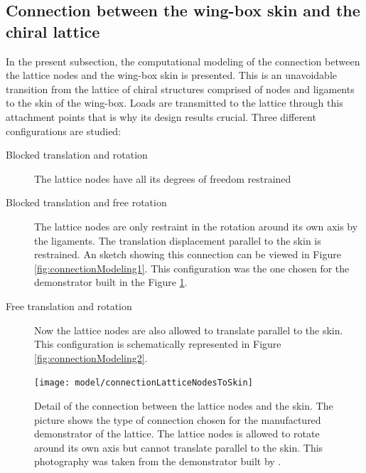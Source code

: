   \clearpage
  \subsection{Connection between the wing-box skin and the chiral lattice} \label{subsec:connections_computationalModel}

    In the present subsection, the computational modeling of the connection between the lattice nodes and the wing-box skin is presented. This is an unavoidable transition from the lattice of chiral structures comprised of nodes and ligaments to the skin of the wing-box. Loads are transmitted to the lattice through this attachment points that is why its design results crucial. Three different configurations are studied:

    \begin{description}
      \item[Blocked translation and rotation] The lattice nodes have all its degrees of freedom restrained 
      \item[Blocked translation and free rotation] The lattice nodes are only restraint in the rotation around its own axis by the ligaments. The translation displacement parallel to the skin is restrained. An sketch showing this connection can be viewed in Figure \ref{fig:connectionModeling1}. This configuration was the one chosen for the demonstrator built in the Figure \ref{fig:connectionLatticeNodesToSkin}.
      \item[Free translation and rotation] Now the lattice nodes are also allowed to translate parallel to the skin. This configuration is schematically represented in Figure \ref{fig:connectionModeling2}.
    \end{description}

    \begin{figure}[!htpb]
      \centering
      \texttt{[image: model/connectionLatticeNodesToSkin]}
      \caption[Detail of the connection between the lattice nodes and the skin]{Detail of the connection between the lattice nodes and the skin. The picture shows the type of connection chosen for the manufactured demonstrator of the lattice. The lattice nodes is allowed to rotate around its own axis but cannot translate parallel to the skin. This photography was taken from the demonstrator built by \cite{Vincenz2017}.}\label{fig:connectionLatticeNodesToSkin}
    \end{figure}

